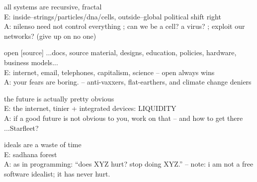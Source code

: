 \documentclass{article}
\begin{document}
\pagebreak

\begin{center}
  \Huge{all systems are recursive, fractal}\\
  \vspace{3cm}
  \Huge{E: inside--strings/particles/dna/cells, outside--global political shift right}\\
  \Huge{A: nilenso need not control everything ; can we be a cell? a virus? ; exploit our networks? (give up on no one)}
\end{center}

\pagebreak

\begin{center}
  \Huge{open [source] ...docs, source material, designs, education, policies, hardware, business models...}\\
  \vspace{3cm}
  \Huge{E: internet, email, telephones, capitalism, science -- open always wins}\\
  \Huge{A: your fears are boring. -- anti-vaxxers, flat-earthers, and climate change deniers}
\end{center}

\pagebreak

\begin{center}
  \Huge{the future is actually pretty obvious}\\
  \vspace{3cm}
  \Huge{E: the internet, tinier + integrated devices: LIQUIDITY}\\
  \Huge{A: if a good future is not obvious to you, work on that -- and how to get there ...Starfleet?}
\end{center}

\pagebreak

\begin{center}
  \Huge{ideals are a waste of time}\\
  \vspace{3cm}
  \Huge{E: sadhana forest}\\
  \Huge{A: as in programming: ``does XYZ hurt? stop doing XYZ.'' -- note: i am not a free software idealist; it has never hurt.}
\end{center}
\end{document}
